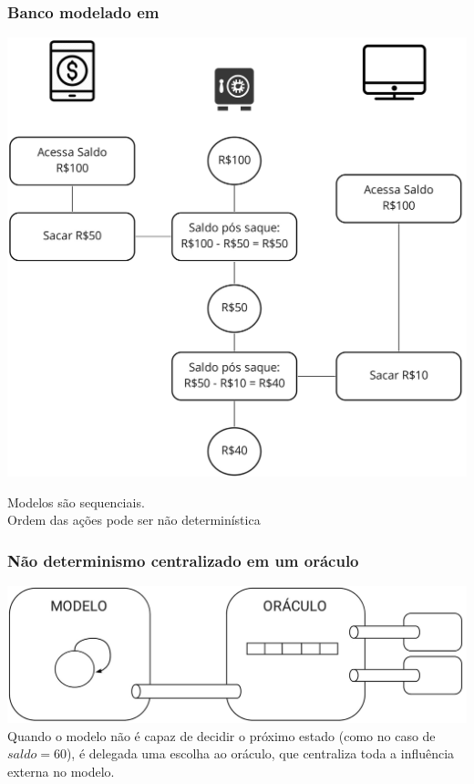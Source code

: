 \documentclass{beamer}
\begin{document}
\begin{frame}
  \frametitle{Banco modelado em \TLA}

  \begin{minipage}{0.6\textwidth}
  \includegraphics[scale=0.12]{img/bank2.png}
  \end{minipage}
  \hfill
  \begin{minipage}{0.3\textwidth}\centering
    Modelos são sequenciais.\\\medskip
    Ordem das ações pode ser não determinística\\\medskip
  \end{minipage}
\end{frame}

\begin{frame}
  \frametitle{Não determinismo centralizado em um oráculo}
  \includegraphics[scale=0.18]{img/diagram.png}\\
  Quando o modelo não é capaz de decidir o próximo estado (como no caso de
  $saldo = 60$), é delegada uma escolha ao oráculo, que centraliza toda a
  influência externa no modelo.
\end{frame}  
\end{document}
